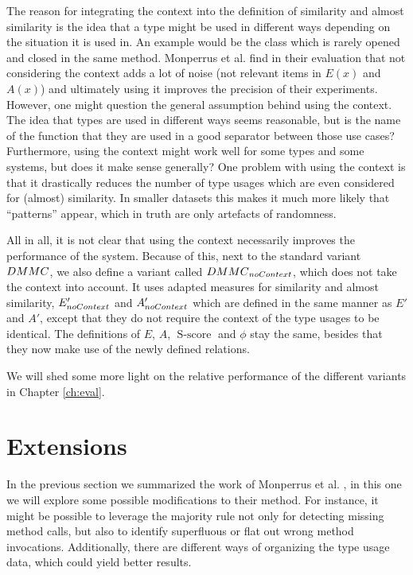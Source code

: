 The reason for integrating the context into the definition of similarity and almost similarity is the idea that a type might be used in different ways depending on the situation it is used in.
An example would be the class  which is rarely opened and closed in the same method.
Monperrus et al. \cite{monperrus2013detecting} find in their evaluation that not considering the context adds a lot of noise (not relevant items in $E(x)$ and $A(x)$) and ultimately using it improves the precision of their experiments.
However, one might question the general assumption behind using the context.
The idea that types are used in different ways seems reasonable, but is the name of the function that they are used in a good separator between those use cases?
Furthermore, using the context might work well for some types and some systems, but does it make sense generally?
One problem with using the context is that it drastically reduces the number of type usages which are even considered for (almost) similarity.
In smaller datasets this makes it much more likely that ``patterns'' appear, which in truth are only artefacts of randomness.

All in all, it is not clear that using the context necessarily improves the performance of the system.
Because of this, next to the standard variant $\mathnormal{DMMC}$, we also define a variant called $\mathnormal{DMMC}_{\mathnormal{noContext}}$, which does not take the context into account.
It uses adapted measures for similarity and almost similarity, $E'_{\mathnormal{noContext}}$ and $A'_{\mathnormal{noContext}}$ which are defined in the same manner as $E'$ and $A'$, except that they do not require the context of the type usages to be identical.
The definitions of $E$, $A$, $\operatorname{S-score}$ and $\phi$ stay the same, besides that they now make use of the newly defined relations.

We will shed some more light on the relative performance of the different variants in Chapter \ref{ch:eval}.

\section{Extensions}

In the previous section we summarized the work of Monperrus et al. \cite{monperrus2010detecting}\cite{monperrus2013detecting}, in this one we will explore some possible modifications to their method.
For instance, it might be possible to leverage the majority rule not only for detecting missing method calls, but also to identify superfluous or flat out wrong method invocations.
Additionally, there are different ways of organizing the type usage data, which could yield better results.


